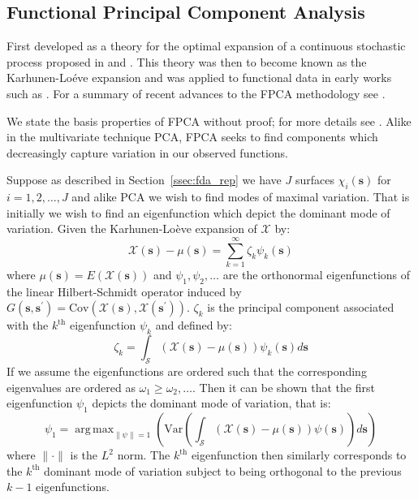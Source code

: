 \documentclass{article}
\DeclareMathOperator*{\argmax}{arg\,max}
\newcommand{\ve}[1]{\bm{{#1}}}
\begin{document}
\subsection{\label{ssec:fpca} Functional Principal Component Analysis}
First developed as a theory for the optimal expansion of a continuous stochastic process proposed in \citet{karhunen_zur_1946} and \citet{loeve_fonctions_1946}. This theory was then to become known as the Karhunen-Lo\'{e}ve expansion and was applied to functional data in early works such as \citet{tucker_determination_1958}. For a summary of recent advances to the FPCA methodology see \citet{shang_survey_2013}.

We state the basis properties of FPCA without proof; for more details see \citet{ramsay_functional_2010}. Alike in the multivariate technique PCA, FPCA seeks to find components which decreasingly capture variation in our observed functions. 

Suppose as described in Section~\ref{ssec:fda_rep} we have $J$ surfaces $\chi_i\left( \ve{s} \right)$ for $i=1,2,\dots,J$ and alike PCA we wish to find modes of maximal variation. That is initially we wish to find an eigenfunction which depict the dominant mode of variation. Given the Karhunen-Lo\`{e}ve expansion of $\mathcal{X}$ by:
\begin{equation}
  \mathcal{X}(\ve{s}) - \mu(\ve{s}) = \sum_{k=1}^\infty \zeta_k \psi_k(\ve{s})
  \label{eqn:kl}
\end{equation}
where $\mu(\ve{s})= E\left( \mathcal{X}\left( \ve{s} \right) \right)$ and $\psi_1, \psi_2, \dots$ are the orthonormal eigenfunctions of the linear Hilbert-Schmidt operator induced by $G\left( \ve{s},  \ve{s}^\prime \right) = \text{Cov}\left( \mathcal{X}\left( \ve{s} \right), \mathcal{X}\left( \ve{s}^\prime \right) \right)$. $\zeta_k$ is the principal component associated with the $k^\text{th}$ eigenfunction $\psi_k$ and defined by:
\begin{equation}
  \zeta_k = \int_\mathcal{S} \left( \mathcal{X}\left( \ve{s} \right) - \mu\left( \ve{s} \right) \right) \psi_k\left( \ve{s} \right) d\ve{s}
  \label{eqn:pc}
\end{equation}
If we assume the eigenfunctions are ordered such that the corresponding eigenvalues are ordered as $\omega_1 \ge \omega_2, \dots$. Then it can be shown that the first eigenfunction $\psi_1$ depicts the dominant mode of variation, that is:
\begin{equation}
  \psi_1 = \argmax_{\lVert \psi \rVert = 1} \left( \text{Var}\left( \int_\mathcal{S}\left( \mathcal{X}\left( \ve{s} \right) - \mu\left( \ve{s} \right) \right) \psi\left( \ve{s} \right) \right) d\ve{s} \right)
  \label{eqn:dominant}
\end{equation}
where $\lVert \cdot \rVert$ is the $L^2$ norm. The $k^\text{th}$ eigenfunction then similarly corresponds to the $k^\text{th}$ dominant mode of variation subject to being orthogonal to the previous $k-1$ eigenfunctions. 
\end{document}
